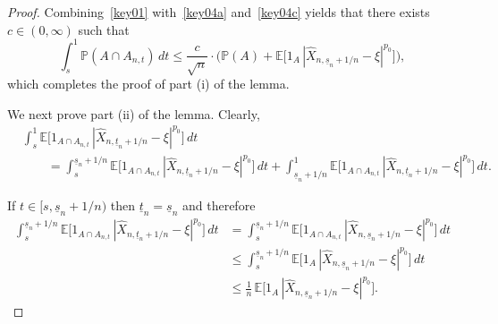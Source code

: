 \documentclass[11pt]{amsart}
\newcommand{\EE}{{\mathbb E}}
\newcommand{\PP}{{\mathbb P}}
\newcommand{\eul}{{\widehat X}}
\newcommand{\ind}{1}
\newcommand{\usn}{\underline {s}_n}
\newcommand{\utn}{\underline {t}_n}
\theoremstyle{plain}
\theoremstyle{definition}
\begin{document}
\begin{proof}
Combining~\eqref{key01} with~\eqref{key04a} and~\eqref{key04c} yields that there exists $c\in(0, \infty)$ such that
\begin{equation}\label{key04d}
 \int_{s}^1\PP(A \cap A_{n,t})\, dt \le \frac{c}{\sqrt n}\cdot \bigl(\PP(A) + \EE\bigl[1_A \,  |\eul_{n,\usn+1/n}-\xi|^{p_0}\bigr]\bigr),
\end{equation}
 which completes the proof of part (i) of the lemma.





We next prove part (ii) of the lemma.
Clearly,
\begin{align*}
& \int_s^{1} \EE\bigl[\ind_{A\cap A_{n,t}} \,|\eul_{n,\utn+1/n}-\xi|^{p_0}\bigr]\, dt \\
& \qquad =\int_s^{\usn+1/n}\EE\bigl[\ind_{A\cap A_{n,t}} \,|\eul_{n,\utn+1/n}-\xi|^{p_0}\bigr]\, dt+ \int_{\usn+1/n}^1\EE\bigl[\ind_{A\cap A_{n,t}} \,|\eul_{n,\utn+1/n}-\xi|^{p_0}\bigr]\, dt.
\end{align*}



If $t\in[s, \usn+1/n)$ then $\underline t_n=\underline s_n$ and therefore
\begin{equation}\label{key003}
\begin{aligned}
 \int_s^{\usn+1/n} \EE\bigl[\ind_{A\cap A_{n,t}}  \,|\eul_{n,\utn+1/n}-\xi|^{p_0}\bigr]\, dt&=\int_s^{\usn+1/n}\EE\bigl[\ind_{A\cap A_{n,t}}\,|\eul_{n,\usn+1/n}-\xi|^{p_0} \bigr]\, dt\\
& \le  \int_s^{\usn+1/n}  \EE\bigl[\ind_A \,|\eul_{n,\usn+1/n}-\xi|^{p_0}\bigr]\, dt
\\ &  \le \frac{1}{n}\,  \EE\bigl[\ind_A\,|\eul_{n,\usn+1/n}-\xi|^{p_0}\bigr].
\end{aligned}
\end{equation}


\end{proof}
\end{document}
